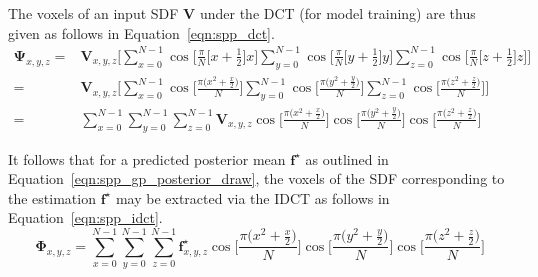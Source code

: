 The voxels of an input SDF \( \bm{V} \) under the DCT (for model training) are thus given 
as follows in Equation~\ref{eqn:spp_dct}.
\begin{align}
  \label{eqn:spp_dct}
  \bm{\Psi}_{x, y, z} ={}& \bm{V}_{x, y, z} \Bigg[
  \sum_{x=0}^{N-1} \cos \Big[ \frac{\pi}{N} \big[ x + \frac{1}{2} \big] x \Big]
  \sum_{y=0}^{N-1} \cos \Big[ \frac{\pi}{N} \big[ y + \frac{1}{2} \big] y \Big]
  \sum_{z=0}^{N-1} \cos \Big[ \frac{\pi}{N} \big[ z + \frac{1}{2} \big] z \Big] \Bigg]\\
  ={}& \bm{V}_{x, y, z} \Bigg[
  \sum_{x=0}^{N-1} \cos \Big[ \frac{\pi \big( x^{2} + \frac{x}{2} \big)}{N} \Big]
  \sum_{y=0}^{N-1} \cos \Big[ \frac{\pi \big( y^{2} + \frac{y}{2} \big)}{N} \Big]
  \sum_{z=0}^{N-1} \cos \Big[ \frac{\pi \big( z^{2} + \frac{z}{2} \big)}{N} \Big] \Bigg]\\
  ={}& \sum_{x=0}^{N-1} \sum_{y=0}^{N-1} \sum_{z=0}^{N-1} \bm{V}_{x, y, z}
  \cos \Big[ \frac{\pi \big( x^{2} + \frac{x}{2} \big)}{N} \Big]
  \cos \Big[ \frac{\pi \big( y^{2} + \frac{y}{2} \big)}{N} \Big]
  \cos \Big[ \frac{\pi \big( z^{2} + \frac{z}{2} \big)}{N} \Big]
\end{align}

It follows that for a predicted posterior mean \( \bm{f}^{\star} \) as outlined in 
Equation~\ref{eqn:spp_gp_posterior_draw}, the voxels of the SDF corresponding to the 
estimation \( \bm{f}^{\star} \) may be extracted via the IDCT as follows in 
Equation~\ref{eqn:spp_idct}.
\begin{equation}
  \label{eqn:spp_idct}
  \bm{\Phi}_{x, y, z} = \sum_{x=0}^{N-1} \sum_{y=0}^{N-1} \sum_{z=0}^{N-1} 
  \bm{f}^{\star}_{x, y, z}
  \cos \Big[ \frac{\pi \big( x^{2} + \frac{x}{2} \big)}{N} \Big]
  \cos \Big[ \frac{\pi \big( y^{2} + \frac{y}{2} \big)}{N} \Big]
  \cos \Big[ \frac{\pi \big( z^{2} + \frac{z}{2} \big)}{N} \Big]
\end{equation}

